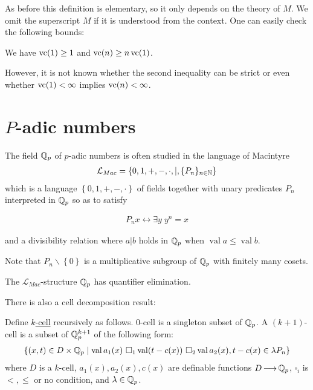 \documentclass{amsart}
\newcommand{\LLM}{\mathcal L_{Mac}}
\newcommand{\curly}[1]{\left\{#1\right\}}
\DeclareMathOperator{\vval}{val}
\newcommand{\defn}{\underline}
\begin{document}
As before this definition is elementary, so it only depends on the theory of $M$.
We omit the superscript $M$ if it is understood from the context.
One can easily check the following bounds:
\begin{Lemma}  We have $\operatorname{vc}(1) \geq 1$ and $\operatorname{vc}(n) \geq n\operatorname{vc}(1)$.
  
\end{Lemma}

However, it is not known whether the second inequality can be strict or even whether $\operatorname{vc}(1) < \infty$ implies $\operatorname{vc}(n) < \infty$.


\section{$P$-adic numbers}


The field $\mathbb{Q}_p$ of $p$-adic numbers is often studied in the language of Macintyre 
  \begin{align*}
	\LLM = \curly{0, 1, +, -, \cdot, |, \{P_n\}_{n \in \N}}
  \end{align*}
which is a language $\curly{0, 1, +, -, \cdot}$ of fields together with unary predicates $P_n$ interpreted in $\mathbb{Q}_p$ so as to satisfy

\begin{align*}
  P_n x \leftrightarrow \exists y \; y^n = x
\end{align*}

and a divisibility relation where $a|b$ holds in $\mathbb{Q}_p$ when $\vval a \leq \vval b$.

Note that $P_n\backslash \curly{0}$ is a multiplicative subgroup of $\mathbb{Q}_p$ with finitely many cosets.

\begin{Theorem} [Macintyre '76]
  The $\LLM$-structure $\mathbb{Q}_p$ has quantifier elimination.
\end{Theorem}

There is also a cell decomposition result:
\begin{Definition}
  Define \defn{$k$-cell} recursively as follows.
  $0$-cell is a singleton subset of $\mathbb{Q}_p$.
  A $(k+1)$-cell is a subset of $\mathbb{Q}_p^{k+1}$ of the following form:
  \begin{align*}
    \curly{(x, t) \in D \times \Q_p \mid \vval a_1(x) \ \square_1 \vval (t - c(x)) \ \square_2 \vval a_2(x), t - c(x) \in \lambda P_n}
  \end{align*}
  where $D$ is a $k$-cell,
  $a_1(x), a_2(x), c(x)$ are definable functions $D \operatorname{\longrightarrow} \mathbb{Q}_p$,
  $\square_i$ is $<, \leq$ or no condition, and
  $\lambda \in \mathbb{Q}_p$.    
\end{Definition}
\end{document}
